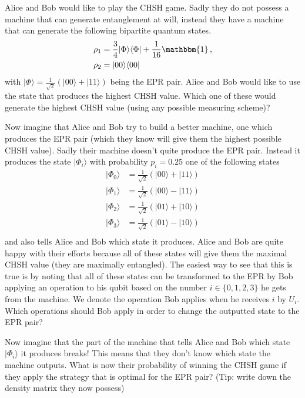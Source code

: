 \documentclass[a4paper,10pt,landscape,twocolumn]{scrartcl}
\newcommand{\ket}[1]{| #1 \rangle}
\newcommand{\bra}[1]{\langle #1 |}
\begin{document}
\begin{exercise}

\begin{subex}
Alice and Bob would like to play the CHSH game. Sadly they do not possess a machine that can generate entanglement at will, instead they have a machine that can generate the following bipartite quantum states.
\begin{align*}
\rho_1 &= \frac{3}{4}\ket{\Phi}\bra{\Phi} + \frac{1}{16} \mathbbm{1} \, , \\
\rho_2 &= \ket{00}\bra{00}
\end{align*}
with $\ket{\Phi} = \frac{1}{\sqrt{2}} (\ket{00} + \ket{11})$ being the EPR pair. Alice and Bob would like to use the state that produces the highest CHSH value. Which one of these would generate the highest CHSH value (using any possible measuring scheme)?
\end{subex}

\begin{subex}
Now imagine that Alice and Bob try to build a better machine, one which produces the EPR pair (which they know will give them the highest possible CHSH value). Sadly their machine doesn't quite produce the EPR pair. Instead it produces the state $\ket{\Phi_i}$ with probability $p_i=0.25$ one of the following states
\begin{align*}
\ket{\Phi_0} &= \frac{1}{\sqrt{2}} ( \ket{00} + \ket{11} ) \\
\ket{\Phi_1} &= \frac{1}{\sqrt{2}} ( \ket{00} - \ket{11} ) \\
\ket{\Phi_2} &= \frac{1}{\sqrt{2}} ( \ket{01} + \ket{10} ) \\
\ket{\Phi_3} &= \frac{1}{\sqrt{2}} ( \ket{01} - \ket{10} ) \\
\end{align*}
and also tells Alice and Bob which state it produces. Alice and Bob are quite happy with their efforts because all of these states will give them the maximal CHSH value (they are maximally entangled). The easiest way to see that this is true is by noting that all of these states can be transformed to the EPR by Bob applying an operation to his qubit based on the number $i \in \{0,1,2,3\}$ he gets from the machine. We denote the operation Bob applies when he receives $i$ by $U_i$. Which operations should Bob apply in order to change the outputted state to the EPR pair?
\end{subex}

\begin{subex}
Now imagine that the part of the machine that tells Alice and Bob which state $\ket{\Phi_i}$ it produces breaks! This means that they don't know which state the machine outputs. What is now their probability of winning the CHSH game if they apply the strategy that is optimal for the EPR pair? (Tip: write down the density matrix they now possess)
\end{subex}
\end{exercise}
\end{document}

